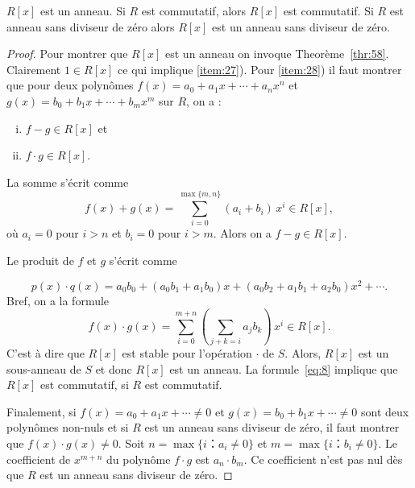 \begin{theorem}
  \label{thr:51}
  $R[x]$ est un anneau. Si $R$ est commutatif, alors $R[x]$ est commutatif. Si $R$ est anneau sans diviseur de zéro    alors $R[x]$ est un  anneau sans diviseur de zéro. 
\end{theorem}
\begin{proof}
  Pour montrer que $R[x]$ est un anneau on  invoque  Theorème~\ref{thr:58}. Clairement $1 ∈ R[x]$ ce qui implique  \ref{item:27}). Pour \ref{item:28})
  il faut montrer que
  pour deux polynômes $f(x) = a_0 + a_1 x + \cdots + a_n x^n$ et $g(x) = b_0 + b_1x + \cdots + b_m x^m$ sur $R$, on a : 
  \begin{enumerate}[i)]
  \item $f- g ∈ R[x]$ et
  \item $f ⋅ g ∈R[x]$. 
  \end{enumerate}
  La somme s'écrit comme
  \begin{equation}
    \label{eq:47}
    f(x) + g(x) = ∑_{i=0}^{\max\{m,n\}} (a_i +  b_i) \, x^i  ∈R[x], 
  \end{equation}
  où $a_i = 0$ pour $i>n$ et $b_i = 0$ pour $i>m$. 
  Alors
  on a $f-g ∈ R[x]$. 
  
  Le    produit de $f$ et $g$ s'écrit comme

  \begin{equation}
  \label{ceq:21}
  p(x) ⋅q(x) = a_0 b_0 + (a_0b_1 +a_1b_0) x + (a_0b_2+ a_1b_1 + a_2b_0)x^2 + \cdots .
\end{equation}
Bref, on a la formule 
  \begin{equation}
    \label{eq:8}
    f(x) ⋅g(x) = ∑_{i=0}^{m+n} ( ∑_{j+k = i} a_j b_k) \, x^i ∈ R[x]. 
  \end{equation}
  C'est à dire que $R[x]$ est stable pour l'opération $⋅$ de $S$.  Alors, $R[x]$ est un sous-anneau de $S$ et 
  donc $R[x]$ est un anneau. La formule~\eqref{eq:8} implique que
  $R[x]$ est commutatif, si $R$ est commutatif.

  Finalement, si $f(x) = a_0 + a_1 x + \cdots ≠ 0$ et
  $g(x) = b_0 + b_1 x + \cdots ≠ 0 $ sont deux polynômes non-nuls et si $R$ est un 
  anneau sans diviseur de zéro, il faut montrer que $f(x) ⋅ g(x) ≠
  0$. Soit $n = \max\{ i ：a_i ≠0 \}$ et $m = \max\{ i ：b_i ≠0 \}$. Le coefficient de $x^{m+n}$ du polynôme $f⋅g$ est $a_n ⋅b_m$. Ce coefficient n'est pas nul dès que $R$  est un 
  anneau sans diviseur de zéro. 
\end{proof}

